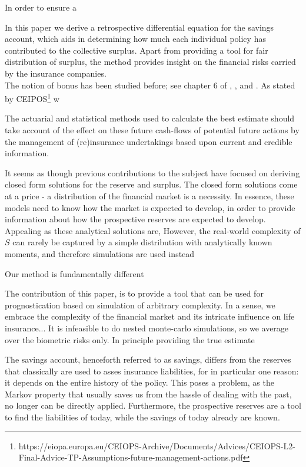 \documentclass[12pt]{article}
\begin{document}
In order to ensure a

 In this paper we derive a retrospective differential equation for the savings account, which aids in determining how much each individual policy has contributed to the collective surplus. Apart from providing a tool for fair distribution of surplus, the method provides insight on the financial risks carried by the insurance companies.\\
The notion of bonus has been studied before; see chapter 6 of \citet{Liv2}, \citet{NorbergB}, \citet{Steffensen0} and \citet{Steffensen1}.  As stated by CEIPOS\footnote{https://eiopa.europa.eu/CEIOPS-Archive/Documents/Advices/CEIOPS-L2-Final-Advice-TP-Assumptions-future-management-actions.pdf} w
\begin{displayquote}
The actuarial and statistical methods used to calculate the best estimate should take account of the effect on these future cash-flows of potential future actions by the management of (re)insurance undertakings based upon current and credible information.
\end{displayquote}

It seems as though previous contributions to the subject have focused on deriving closed form solutions for the reserve and surplus. The closed form solutions come at a price - a distribution of the financial market is a necessity. In essence, these models need to know how the market is expected to develop, in order to provide information about how the prospective reserves are expected to develop. Appealing as these analytical solutions are, However, the real-world complexity of $S$ can rarely be captured by a simple distribution with analytically known moments, and therefore simulations are used instead


Our method is fundamentally different

The contribution of this paper, is to provide a tool that can be used for prognostication based on simulation of arbitrary complexity. In a sense, we embrace the complexity of the financial market and its intricate influence on life insurance... It is infeasible to do nested monte-carlo simulations, so we average over the biometric risks only. In principle providing the true estimate

The savings account, henceforth referred to as savings, differs from the reserves that classically are used to asses insurance liabilities, for in particular one reason: it depends on the entire history of the policy. This poses a problem, as the Markov property that usually saves us from the hassle of dealing with the past, no longer can be directly applied. Furthermore, the prospective reserves are a tool to find the liabilities of today, while the savings of today already are known. 
\end{document}
